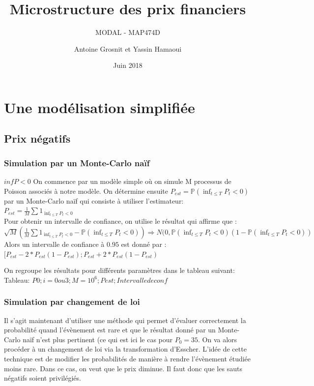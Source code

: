 \documentclass[a4paper,11pt]{article}
\title{Microstructure des prix financiers}
\author{Antoine Grosnit et Yassin Hamaoui}
\subtitle{MODAL - MAP474D}
\date{Juin 2018}
\begin{document}
\maketitle
\section{Une modélisation simplifiée}

\subsection{Prix négatifs}

\subsubsection{Simulation par un Monte-Carlo naïf}

$inf P<0$
On commence par un modèle simple où on simule M processus de Poisson associés à notre modèle. On détermine ensuite $P_{est}=\mathbb{P}(\inf_{t\leq T} P_{t}< 0)$ par un Monte-Carlo naïf qui consiste à utiliser l'estimateur: $P_{est}=\frac{1}{M}\sum 1_{ \inf_{t\leq T} P_{t}< 0}$ \\

Pour obtenir un intervalle de confiance, on utilise le résultat qui affirme que : 
$\sqrt{M}(\frac{1}{M}\sum 1_{ \inf_{t\leq T} P_{t}< 0}-\mathbb{P}(\inf_{t\leq T} P_{t}< 0)) \Rightarrow N(0,\mathbb{P}(\inf_{t\leq T} P_{t}< 0)(1-\mathbb{P}(\inf_{t\leq T} P_{t}< 0))$ \\

Alors un intervalle de confiance à $0.95$ est donné par : $[P_{est}-2*P_{est}(1-P_{est});P_{est}+2*P_{est}(1-P_{est})$ 


On regroupe les résultats pour différents paramètres dans le tableau suivant: \\
Tableau: $P0; i=0 ou 3 ;M=10^6; Pest; Intervalle de conf$



\subsubsection{Simulation par changement de loi}

Il s'agit maintenant d'utiliser une méthode qui permet d'évaluer correctement la probabilité quand l'évènement est rare et que le résultat donné par un Monte-Carlo naïf n'est plus pertinent (ce qui est ici le cas pour $P_{0}=35$. On va alors procéder à un changement de loi via la transformation d'Esscher. L'idée de cette technique est de modifier les probabilités de manière à rendre l'évènement étudiée moins rare. Dans ce cas, on veut que le prix diminue. Il faut donc que les sauts négatifs soient privilégiés. 
\end{document}

